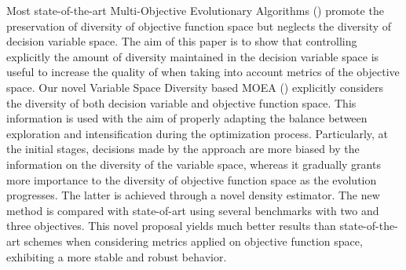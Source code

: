 Most state-of-the-art Multi-Objective Evolutionary Algorithms (\MOEAS{}) promote the preservation of diversity 
of objective function space but neglects the diversity of decision variable space.
%
The aim of this paper is to show that controlling explicitly the amount of diversity maintained in the decision variable space 
is useful to increase the quality of \MOEAS{} when taking into account metrics of the objective space.
%
Our novel Variable Space Diversity based MOEA (\VSDMOEA{})
explicitly considers the diversity of both decision variable and objective function space.
%
This information is used with the aim of properly adapting the balance between exploration
and intensification during the optimization process.
%
Particularly, at the initial stages, decisions made by the approach are more biased by the information on the diversity of 
the variable space, whereas it gradually grants more importance to the diversity of objective function space as the 
evolution progresses.
%
The latter is achieved through a novel density estimator.
%
The new method is compared with state-of-art \MOEAS{} using several benchmarks with two and three objectives.
%
This novel proposal yields much better results than state-of-the-art schemes when considering metrics applied on 
objective function space, exhibiting a more stable and robust behavior.
